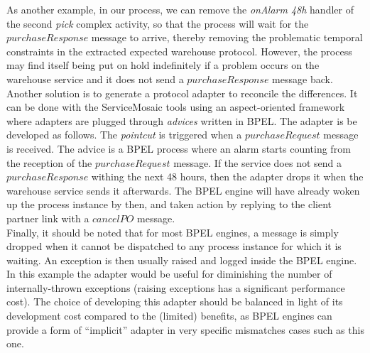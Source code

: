 As another example, in our process, we can remove the \emph{onAlarm 48h} handler of the second \emph{pick} complex activity, so that the process will wait for the $purchaseResponse$ message to arrive, thereby removing the problematic temporal constraints in the extracted expected warehouse protocol. However, the process may find itself being put on hold indefinitely if a problem occurs on the warehouse service and it does not send a $purchaseResponse$ message back.\\

Another solution is to generate a protocol adapter \cite{BenatallahCGNT05} to reconcile the differences.
It can be done with the ServiceMosaic tools using an aspect-oriented framework \cite{KongdenfhaSBC06} where adapters are plugged through \emph{advices} written in BPEL. The adapter is be developed as follows. The \emph{pointcut} is triggered when a $purchaseRequest$ message is received. The advice is a BPEL process where an alarm starts counting from the reception of the $purchaseRequest$ message. If the service does not send a $purchaseResponse$ withing the next 48 hours, then the adapter drops it when the warehouse service sends it afterwards. The BPEL engine will have already woken up the process instance by then, and taken action by replying to the client partner link with a $cancelPO$ message.\\

Finally, it should be noted that for most BPEL engines, a message is simply dropped when it cannot be dispatched to any process instance for which it is waiting. An exception is then usually raised and logged inside the BPEL engine. In this example the adapter would be useful for diminishing the number of internally-thrown exceptions (raising exceptions has a significant performance cost). The choice of developing this adapter should be balanced in light of its development cost compared to the (limited) benefits, as BPEL engines can provide a form of ``implicit'' adapter in very specific mismatches cases such as this one.

